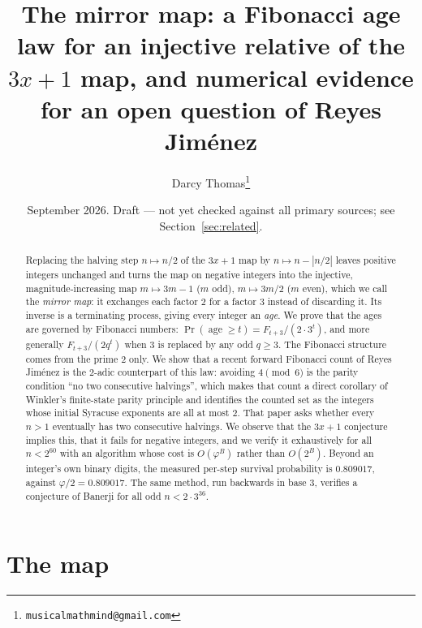 \documentclass[11pt]{article}
\newcommand{\age}{\operatorname{age}}
\begin{document}
\title{The mirror map: a Fibonacci age law for an injective relative of the $3x+1$ map,
and numerical evidence for an open question of Reyes Jim\'enez}
\author{Darcy Thomas\thanks{\texttt{musicalmathmind@gmail.com}}}
\date{September 2026. Draft --- not yet checked against all primary sources; see Section~\ref{sec:related}.}



\maketitle

\begin{abstract}
Replacing the halving step $n\mapsto n/2$ of the $3x+1$ map by $n\mapsto n-|n/2|$ leaves positive integers
unchanged and turns the map on negative integers into the injective, magnitude-increasing map
$m\mapsto 3m-1$ ($m$ odd), $m\mapsto 3m/2$ ($m$ even), which we call the \emph{mirror map}: it exchanges each
factor $2$ for a factor $3$ instead of discarding it. Its inverse is a terminating process, giving every
integer an \emph{age}. We prove that the ages are governed by Fibonacci numbers:
$\Pr(\age\ge t)=F_{t+3}/(2\cdot 3^{t})$, and more generally $F_{t+3}/(2q^{t})$ when $3$ is replaced by any odd
$q\ge 3$. The Fibonacci structure comes from the prime $2$ only. We show that a recent forward Fibonacci count of
Reyes Jim\'enez is the $2$-adic counterpart of this law: avoiding $4 \pmod 6$ is the parity condition ``no two
consecutive halvings'', which makes that count a direct corollary of Winkler's finite-state parity principle and
identifies the counted set as the integers whose initial Syracuse exponents are all at most $2$. That paper asks whether every $n>1$ eventually
has two consecutive halvings. We observe that the $3x+1$ conjecture implies this, that it fails for negative
integers, and we verify it exhaustively for all $n<2^{60}$ with an algorithm whose cost is $O(\varphi^{B})$ rather
than $O(2^{B})$. Beyond an integer's own binary digits, the measured per-step survival probability is $0.809017$,
against $\varphi/2=0.809017$. The same method, run backwards in base $3$, verifies a conjecture of Banerji for all
odd $n<2\cdot 3^{36}$.
\end{abstract}

\section{The map}
\end{document}
